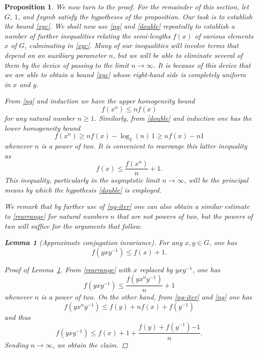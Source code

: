 \documentclass{article}
\numberwithin{equation}{section}
\theoremstyle{plain}
\newtheorem{proposition}[equation]{Proposition}
\newtheorem{lemma}[equation]{Lemma}
\theoremstyle{definition}
\begin{document}
\begin{proposition}
We now turn to the proof. For the remainder of this section, let $G$,
{ $1$}, and $fsymb$ satisfy the hypotheses of the
proposition.  Our task is to establish the bound \eqref{xyc}.  We shall
now use \eqref{ng} and \eqref{double} repeatedly to establish a number of
further inequalities relating the { semi-}lengths $f(x)$ of various
elements $x$ of $G$, culminating in \eqref{xyc}.
Many of our inequalities will involve terms that depend on an auxiliary
parameter $n$, but we will be able to eliminate several of them by the
device of passing to the limit $n \to \infty$.  It is because of this
device that we are able to obtain a bound \eqref{xyc} whose right-hand
side is completely uniform in $x$ and $y$.

From \eqref{ng} and induction we have the upper homogeneity
bound
\begin{equation}\label{ng-iter}
	f(x^n) \leq { n f(x)}
\end{equation}
for any natural number $n \geq 1$.  Similarly, from \eqref{double} and
induction one has the lower homogeneity bound
\[
	f(x^n) \geq { n f(x) - \log_2(n)\, 1 \geq n f(x) - n 1}
\]
whenever $n$ is a power of two.  It is convenient to rearrange this
latter inequality as
\begin{equation}\label{rearrange}
	f(x) \leq \frac{f(x^n)}{n}  + { 1}.
\end{equation}
This inequality, particularly in the asymptotic limit $n \to \infty$,
will be the principal means by which the hypothesis \eqref{double} is
employed.

We remark that by further use of \eqref{ng-iter} one can also obtain a
similar estimate to \eqref{rearrange} for natural numbers $n$ that are
not powers of two, but the powers of two will suffice for the
arguments that follow.

\begin{lemma}[Approximate conjugation invariance]\label{aci}
	For any $x,y \in G$, one has
	\[
		f(yxy^{-1} ) \leq { f( x ) + 1}.
	\]
\end{lemma}

\begin{proof}[Proof of Lemma~\ref{aci}]
	From \eqref{rearrange} with $x$ replaced by $yxy^{-1}$, one has
	\[
		f(yxy^{-1}) \leq \frac{f(y x^n y^{-1}) }{n} + { 1}
	\]
	whenever $n$ is a power of two.  On the other hand, from \eqref{ng-iter}
	and \eqref{ng} one has
	\[
		f( y x^n y^{-1} ) \leq f(y) + n f(x) + f(y^{-1})
	\]
	and thus
	\[
		f(yxy^{-1}) \leq f(x) + { 1} + \frac{f(y) +
			f(y^{-1}) { - 1}}{n}.
	\]
	Sending $n \to \infty$, we obtain the claim.
\end{proof}



\end{proposition}
\end{document}
